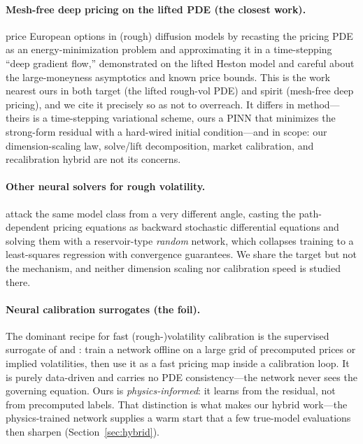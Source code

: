 \documentclass[11pt]{article}
\begin{document}
\paragraph{Mesh-free deep pricing on the lifted PDE (the closest work).}
\citet{papapantoleon2025timestepping} price European options in (rough) diffusion
models by recasting the pricing PDE as an energy-minimization problem and
approximating it in a time-stepping ``deep gradient flow,'' demonstrated on the
lifted Heston model and careful about the large-moneyness asymptotics and known
price bounds. This is the work nearest ours in both target (the lifted rough-vol
PDE) and spirit (mesh-free deep pricing), and we cite it precisely so as not to
overreach. It differs in method---theirs is a time-stepping variational scheme,
ours a PINN that minimizes the strong-form residual with a hard-wired initial
condition---and in scope: our dimension-scaling law, solve/lift decomposition,
market calibration, and recalibration hybrid are not its concerns.

\paragraph{Other neural solvers for rough volatility.}
\citet{jacquier2023random} attack the same model class from a very different
angle, casting the path-dependent pricing equations as backward stochastic
differential equations and solving them with a reservoir-type \emph{random}
network, which collapses training to a least-squares regression with convergence
guarantees. We share the target but not the mechanism, and neither dimension
scaling nor calibration speed is studied there.

\paragraph{Neural calibration surrogates (the foil).}
The dominant recipe for fast (rough-)volatility calibration is the supervised
surrogate of \citet{bayer2019deep} and \citet{horvath2021deep}: train a network
offline on a large grid of precomputed prices or implied volatilities, then use it
as a fast pricing map inside a calibration loop. It is purely data-driven and
carries no PDE consistency---the network never sees the governing equation. Ours
is \emph{physics-informed}: it learns from the residual, not from precomputed
labels. That distinction is what makes our hybrid work---the physics-trained
network supplies a warm start that a few true-model evaluations then sharpen
(Section~\ref{sec:hybrid}).
\end{document}

